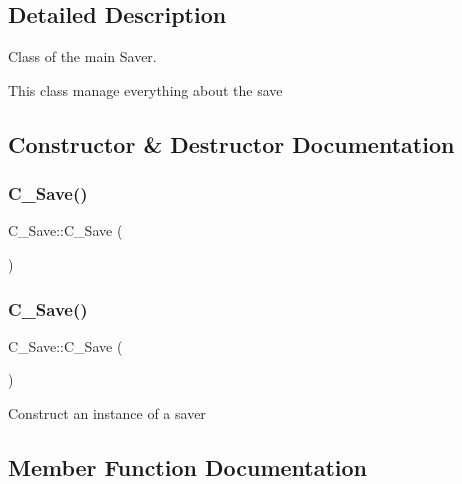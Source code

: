 \subsection{Detailed Description}
Class of the main Saver. 

This class manage everything about the save 

\subsection{Constructor \& Destructor Documentation}
\mbox{\label{classC__Save_adc49f753d7b0f40c95ec2b93f81b9672}} 
\subsubsection{\texorpdfstring{C\+\_\+\+Save()}{C\_Save()}\hspace{0.1cm}{\footnotesize\ttfamily [1/2]}}
{\footnotesize\ttfamily C\+\_\+\+Save\+::\+C\+\_\+\+Save (\begin{DoxyParamCaption}{ }\end{DoxyParamCaption})}

\mbox{\label{classC__Save_adc49f753d7b0f40c95ec2b93f81b9672}} 
\subsubsection{\texorpdfstring{C\+\_\+\+Save()}{C\_Save()}\hspace{0.1cm}{\footnotesize\ttfamily [2/2]}}
{\footnotesize\ttfamily C\+\_\+\+Save\+::\+C\+\_\+\+Save (\begin{DoxyParamCaption}{ }\end{DoxyParamCaption})}

Construct an instance of a saver 

\subsection{Member Function Documentation}
\mbox{\label{classC__Save_a144be848679b771afb9cf410710308e8}} 
